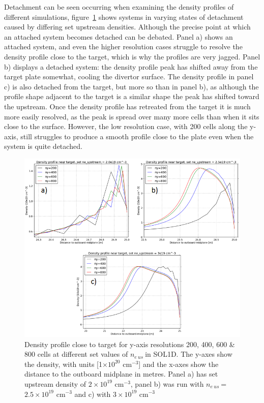 \documentclass[12pt]{article}  %
\providecommand{\e}[1]{\ensuremath{\times 10^{#1}}} %
\providecommand{\noNe}[1]{{${#1}\times 10^{19}$ cm$^{-3}$}} %
\providecommand{\pow}[1]{{$^{#1}$}} %
\providecommand{\neus}{$n_{e~us}~$} %
\begin{document}
Detachment can be seen occurring when examining the density profiles of different simulations, figure~\ref{figneprofneusALLtriang} shows systems in varying states of detachment caused by differing set upstream densities. Although the precise point at which an attached system becomes detached can be debated. Panel a) shows an attached system, and even the higher resolution cases struggle to resolve the density profile close to the target, which is why the profiles are very jagged. Panel b) displays a detached system: the density profile peak has shifted away from the target plate somewhat, cooling the divertor surface. The density profile in panel c) is also detached from the target, but more so than in panel b), as although the profile shape adjacent to the target is a similar shape the peak has shifted toward the upstream. Once the density profile has retreated from the target it is much more easily resolved, as the peak is spread over many more cells than when it sits close to the surface. However, the low resolution case, with 200 cells along the y-axis, still struggles to produce a smooth profile close to the plate even when the system is quite detached. 

\begin{figure}
\includegraphics[scale=0.8]{Figures/sol1d/neprofneusALLtriang.png}
\centering
\caption{Density profile close to target for y-axis resolutions 200, 400, 600 \& 800 cells at different set values of \neus in SOL1D. The y-axes show the density, with units [1\e{20} cm\pow{-3}] and the x-axes show the distance to the outboard midplane in metres. Panel a) has set upstream density of \noNe{2}, panel b) was run with \neus = \noNe{2.5} and c) with \noNe{3}}\label{figneprofneusALLtriang}
\end{figure}
\end{document}
